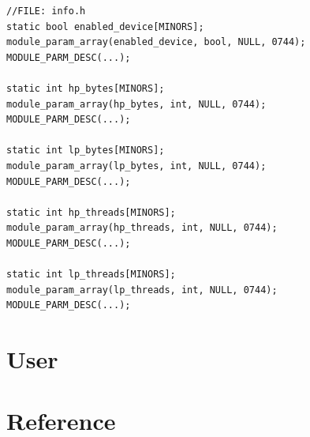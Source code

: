 \documentclass[12pt]{report}
\begin{document}
\begin{lstlisting}
//FILE: info.h
static bool enabled_device[MINORS];
module_param_array(enabled_device, bool, NULL, 0744);
MODULE_PARM_DESC(...);

static int hp_bytes[MINORS];
module_param_array(hp_bytes, int, NULL, 0744);
MODULE_PARM_DESC(...);

static int lp_bytes[MINORS];
module_param_array(lp_bytes, int, NULL, 0744);
MODULE_PARM_DESC(...);

static int hp_threads[MINORS];
module_param_array(hp_threads, int, NULL, 0744);
MODULE_PARM_DESC(...);

static int lp_threads[MINORS];
module_param_array(lp_threads, int, NULL, 0744);
MODULE_PARM_DESC(...);
\end{lstlisting}



\chapter{User}
\chapter{Reference}
\end{document}
